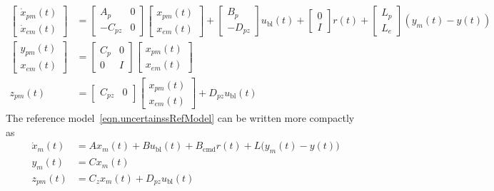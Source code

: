 \begin{equation}
  \label{eqn.uncertainssRefModel}
  \begin{split}
    \begin{bmatrix}
      \dot{x}_{pm}(t) \\
      \dot{x}_{em}(t)
    \end{bmatrix}
    &=
    \begin{bmatrix}
      A_{p} & 0 \\
      -C_{pz} & 0
    \end{bmatrix}
    \begin{bmatrix}
      x_{pm}(t) \\
      x_{em}(t)
    \end{bmatrix} +
    \begin{bmatrix}
      B_{p} \\
      -D_{pz}
    \end{bmatrix} u_{\text{bl}}(t) +
    \begin{bmatrix}
      0 \\
      I
    \end{bmatrix}r(t)
    +
    \begin{bmatrix}
      L_{p} \\
      L_{e}
    \end{bmatrix}(y_{m}(t)-y(t)) \\
    \begin{bmatrix}
      y_{pm}(t) \\
      x_{em}(t)
    \end{bmatrix}
    &=
    \begin{bmatrix}
      C_{p} & 0 \\
      0 & I
    \end{bmatrix}
    \begin{bmatrix}
      x_{pm}(t) \\
      x_{em}(t)
    \end{bmatrix} \\
    z_{pm}(t)
    &=
    \begin{bmatrix}
      C_{pz} & 0
    \end{bmatrix}
    \begin{bmatrix}
      x_{pm}(t) \\
      x_{em}(t)
    \end{bmatrix}
    +
    D_{pz}u_{\text{bl}}(t)
  \end{split}
\end{equation}
The reference model\ \eqref{eqn.uncertainssRefModel} can be written more compactly as
\begin{equation}
  \label{eqn.refmodel0}
  \begin{split}
    \dot{x}_{m}(t) &= Ax_{m}(t) + Bu_{\text{bl}}(t) + B_{\text{cmd}}r(t) + L\bigr(y_{m}(t)-y(t)\bigr) \\
    y_{m}(t) &= Cx_{m}(t) \\
    z_{pm}(t) &= C_{z}x_{m}(t) + D_{pz}u_{\text{bl}}(t)
  \end{split}
\end{equation}
